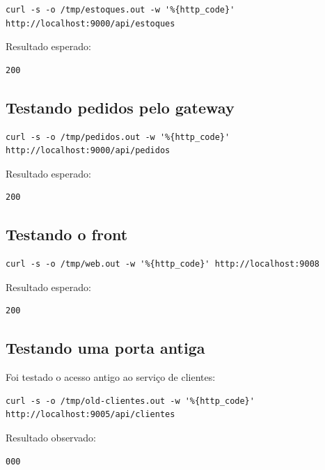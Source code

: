 \documentclass[12pt,a4paper]{article}
\begin{document}
\begin{lstlisting}[style=terminal]
curl -s -o /tmp/estoques.out -w '%{http_code}' http://localhost:9000/api/estoques
\end{lstlisting}

Resultado esperado:

\begin{lstlisting}[style=terminal]
200
\end{lstlisting}

\subsection{Testando pedidos pelo gateway}

\begin{lstlisting}[style=terminal]
curl -s -o /tmp/pedidos.out -w '%{http_code}' http://localhost:9000/api/pedidos
\end{lstlisting}

Resultado esperado:

\begin{lstlisting}[style=terminal]
200
\end{lstlisting}

\subsection{Testando o front}

\begin{lstlisting}[style=terminal]
curl -s -o /tmp/web.out -w '%{http_code}' http://localhost:9008
\end{lstlisting}

Resultado esperado:

\begin{lstlisting}[style=terminal]
200
\end{lstlisting}

\subsection{Testando uma porta antiga}

Foi testado o acesso antigo ao servi\c{c}o de clientes:

\begin{lstlisting}[style=terminal]
curl -s -o /tmp/old-clientes.out -w '%{http_code}' http://localhost:9005/api/clientes
\end{lstlisting}

Resultado observado:

\begin{lstlisting}[style=terminal]
000
\end{lstlisting}
\end{document}
